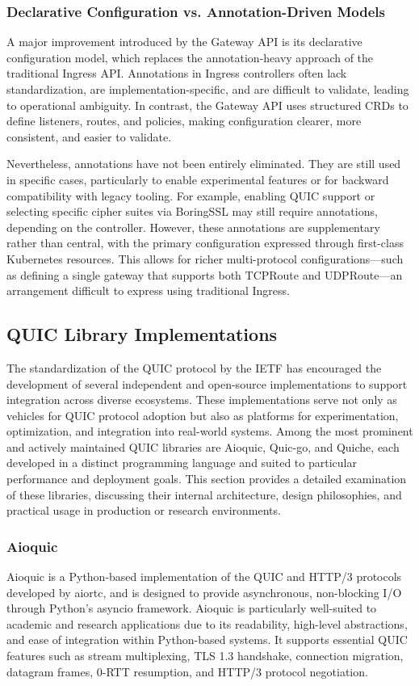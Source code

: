 \subsubsection{Declarative Configuration vs. Annotation-Driven Models}
A major improvement introduced by the Gateway API is its declarative configuration model, which replaces the annotation-heavy approach of the traditional Ingress API. Annotations in Ingress controllers often lack standardization, are implementation-specific, and are difficult to validate, leading to operational ambiguity. In contrast, the Gateway API uses structured CRDs to define listeners, routes, and policies, making configuration clearer, more consistent, and easier to validate.

Nevertheless, annotations have not been entirely eliminated. They are still used in specific cases, particularly to enable experimental features or for backward compatibility with legacy tooling. For example, enabling QUIC support or selecting specific cipher suites via BoringSSL may still require annotations, depending on the controller. However, these annotations are supplementary rather than central, with the primary configuration expressed through first-class Kubernetes resources. This allows for richer multi-protocol configurations—such as defining a single gateway that supports both TCPRoute and UDPRoute—an arrangement difficult to express using traditional Ingress.


\subsection{QUIC Library Implementations}
The standardization of the QUIC protocol by the IETF has encouraged the development of several independent and open-source implementations to support integration across diverse ecosystems. These implementations serve not only as vehicles for QUIC protocol adoption but also as platforms for experimentation, optimization, and integration into real-world systems. Among the most prominent and actively maintained QUIC libraries are Aioquic, Quic-go, and Quiche, each developed in a distinct programming language and suited to particular performance and deployment goals. This section provides a detailed examination of these libraries, discussing their internal architecture, design philosophies, and practical usage in production or research environments.

\subsubsection{Aioquic}
Aioquic is a Python-based implementation of the QUIC and HTTP/3 protocols developed by aiortc, and is designed to provide asynchronous, non-blocking I/O through Python's asyncio framework. Aioquic is particularly well-suited to academic and research applications due to its readability, high-level abstractions, and ease of integration within Python-based systems. It supports essential QUIC features such as stream multiplexing, TLS 1.3 handshake, connection migration, datagram frames, 0-RTT resumption, and HTTP/3 protocol negotiation.


